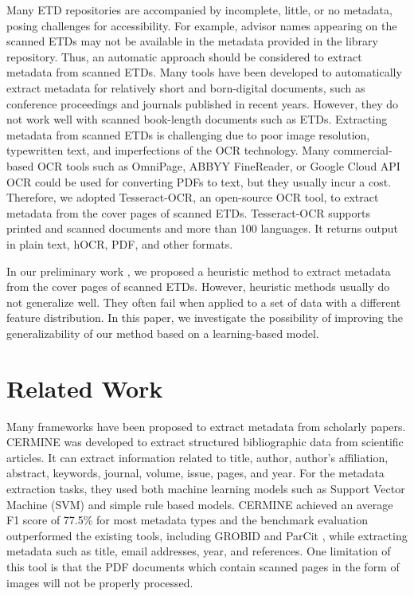 \documentclass{article}
\begin{document}
Many ETD repositories are accompanied by incomplete, little, or no metadata, posing challenges for accessibility. For example, advisor names appearing on the scanned ETDs may not be available in the metadata provided in the library repository. Thus, an automatic approach should be considered to extract metadata from scanned ETDs. Many tools \cite{Lipinski-2013,han-2003,lopez2009grobid,cermine} have been developed to automatically extract metadata for relatively short and born-digital documents, such as conference proceedings and journals published in recent years. However, they do not work well with scanned book-length documents such as ETDs. Extracting metadata from scanned ETDs is challenging due to poor image resolution, typewritten text, and imperfections of the OCR technology. Many commercial-based OCR tools such as OmniPage, ABBYY FineReader, or Google Cloud API OCR could be used for converting PDFs to text, but they usually incur a cost.  Therefore, we adopted Tesseract-OCR, an open-source OCR tool, to extract metadata from the cover pages of scanned ETDs. Tesseract-OCR supports printed and scanned documents and more than 100 languages.
It returns output in plain text, hOCR, PDF, and other formats.

In our preliminary work \cite{choudhury-jcdl2020}, we proposed a heuristic method to extract metadata from the cover pages of scanned ETDs. However, heuristic methods usually do not generalize well. They often fail when applied to a set of data with a different feature distribution. In this paper, we investigate the possibility of improving the generalizability of our method based on a learning-based model.


\section{Related Work}
Many frameworks have been proposed to extract metadata from scholarly papers. CERMINE \cite{cermine} was developed to extract structured bibliographic data from scientific articles. It can extract information related to title, author, author's affiliation, abstract, keywords, journal, volume, issue, pages, and year. For the metadata extraction tasks, they used both machine learning models such as Support Vector Machine (SVM) and simple rule based models. CERMINE achieved an average F1 score of 77.5\% for most metadata types and the benchmark evaluation outperformed the existing tools, including GROBID \cite{lopez2009grobid} and ParCit \cite{councill2008parscit}, while extracting metadata such as title, email addresses, year, and references. One limitation of this tool is that the PDF documents which contain scanned pages in the form of images will not be properly processed.
\end{document}

